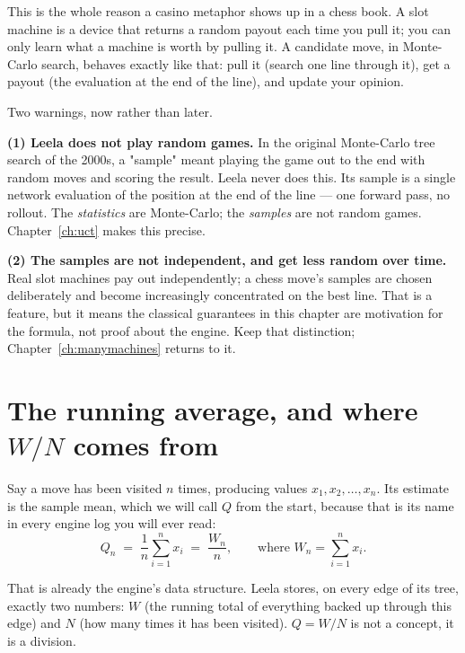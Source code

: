 This is the whole reason a casino metaphor shows up in a chess book. A slot machine is a
device that returns a random payout each time you pull it; you can only learn what a machine
is worth by pulling it. A candidate move, in Monte-Carlo search, behaves exactly like that:
pull it (search one line through it), get a payout (the evaluation at the end of the line),
and update your opinion.

Two warnings, now rather than later.

\begin{pitfall}
\textbf{(1) Leela does not play random games.} In the original Monte-Carlo tree search of the
2000s, a "sample" meant playing the game out to the end with random moves and scoring the
result. Leela never does this. Its sample is a single network evaluation of the position at
the end of the line --- one forward pass, no rollout. The \emph{statistics} are Monte-Carlo;
the \emph{samples} are not random games. Chapter~\ref{ch:uct} makes this precise.

\smallskip
\textbf{(2) The samples are not independent, and get less random over time.} Real slot
machines pay out independently; a chess move's samples are chosen deliberately and become
increasingly concentrated on the best line. That is a feature, but it means the classical
guarantees in this chapter are motivation for the formula, not proof about the engine. Keep
that distinction; Chapter~\ref{ch:manymachines} returns to it.
\end{pitfall}

\section{The running average, and where $W/N$ comes from}

Say a move has been visited $n$ times, producing values $x_1, x_2, \dots, x_n$. Its estimate
is the sample mean, which we will call $Q$ from the start, because that is its name in every
engine log you will ever read:
\begin{equation}
  \label{eq:samplemean}
  Q_n \;=\; \frac{1}{n}\sum_{i=1}^{n} x_i \;=\; \frac{W_n}{n},
  \qquad\text{where } W_n = \sum_{i=1}^{n} x_i .
\end{equation}

That is already the engine's data structure. Leela stores, on every edge of its tree, exactly
two numbers: $W$ (the running total of everything backed up through this edge) and $N$ (how
many times it has been visited). $Q = W/N$ is not a concept, it is a division.

